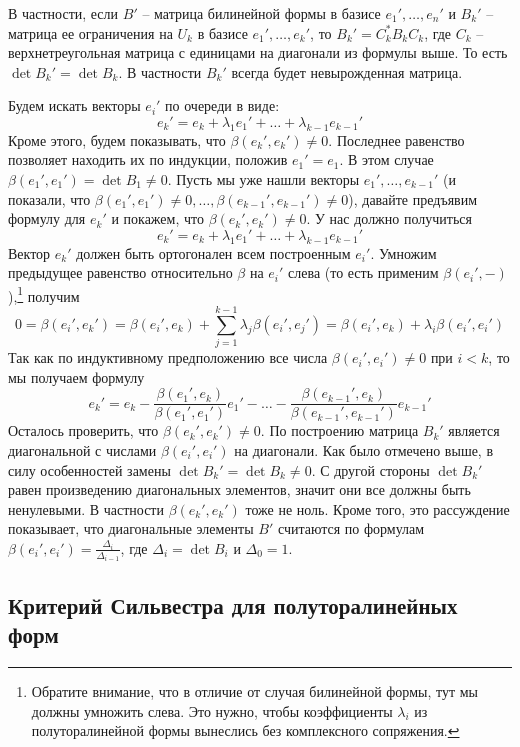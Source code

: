 В частности, если $B'$ -- матрица билинейной формы в базисе $e_1',\ldots,e_n'$ и $B_k'$ -- матрица ее ограничения на $U_k$ в базисе $e_1',\ldots,e_k'$, то $B_k' = C_k^* B_k C_k$, где $C_k$ -- верхнетреугольная матрица с единицами на диагонали из формулы выше. То есть $\det B_k' = \det B_k$. В частности $B_k'$ всегда будет невырожденная матрица.

Будем искать векторы $e_i'$ по очереди в виде:
\[
e_k' = e_k + \lambda_1 e_1' + \ldots + \lambda_{k-1}e_{k-1}'
\]
Кроме этого, будем показывать, что $\beta(e_k',e_k')\neq 0$. Последнее равенство позволяет находить их по индукции, положив $e_1' = e_1$. В этом случае $\beta(e_1',e_1') = \det B_1 \neq 0$. Пусть мы уже нашли векторы $e_1',\ldots,e_{k-1}'$ (и показали, что $\beta(e_1',e_1')\neq 0,\ldots,\beta(e_{k-1}',e_{k-1}')\neq 0$), давайте предъявим формулу для $e_k'$ и покажем, что $\beta(e_k',e_k')\neq 0$. У нас должно получиться
\[
e_k' = e_k + \lambda_1 e_1' + \ldots + \lambda_{k-1}e_{k-1}'
\]
Вектор $e_k'$ должен быть ортогонален всем построенным $e_i'$. Умножим предыдущее равенство относительно $\beta$ на $e_i'$ слева (то есть применим $\beta(e_i',{-})$),\footnote{Обратите внимание, что в отличие от случая билинейной формы, тут мы должны умножить слева. Это нужно, чтобы коэффициенты $\lambda_i$ из полуторалинейной формы вынеслись без комплексного сопряжения.} получим
\[
0 = \beta(e_i',e_k') = \beta(e_i',e_k) +\sum_{j=1}^{k-1}\lambda_j \beta(e_i', e_j')
= \beta(e_i', e_k) + \lambda_i \beta(e_i', e_i')
\]
Так как по индуктивному предположению все числа $\beta(e_i',e_i') \neq 0$ при $i< k$, то мы получаем формулу
\[
e_k' = e_k - \frac{\beta(e_1', e_k)}{\beta(e_1',e_1')} e_1' - \ldots - \frac{\beta(e_{k-1}', e_k)}{\beta(e_{k-1}',e_{k-1}')} e_{k-1}'
\]
Осталось проверить, что $\beta(e_k', e_k')\neq 0$. По построению матрица $B_k'$ является диагональной с числами $\beta(e_i',e_i')$ на диагонали. Как было отмечено выше, в силу особенностей замены $\det B_k' = \det B_k\neq 0$. С другой стороны $\det B_k'$ равен произведению диагональных элементов, значит они все должны быть ненулевыми. В частности $\beta(e_k',e_k')$ тоже не ноль. Кроме того, это рассуждение показывает, что диагональные элементы $B'$ считаются по формулам $\beta(e_i',e_i') = \frac{\Delta_i}{\Delta_{i-1}}$, где $\Delta_i = \det B_i$ и $\Delta_0 = 1$.


\subsection{Критерий Сильвестра для полуторалинейных форм}

